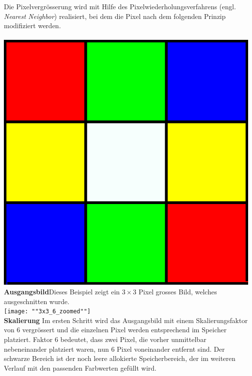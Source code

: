 \documentclass[course=erap]{aspdoc}
\begin{document}
Die Pixelvergrösserung wird mit Hilfe des Pixelwiederholungsverfahrens (engl. {\textit{Nearest Neighbor}}) realisiert, bei dem die Pixel nach dem folgenden Prinzip modifiziert werden. \\
\\
\centering
\includegraphics[scale=0.5]{"3x3"}\\
\justify
\textbf{Ausgangsbild}\hspace{0.5cm}Dieses Beispiel zeigt ein $3 \times 3$ Pixel grosses Bild, welches ausgeschnitten wurde.\\

\centering
\texttt{[image: ""3x3\_6\_zoomed""]}\\
\justify
\textbf{Skalierung}\hspace{0.5cm} Im ersten Schritt wird das Ausgangsbild mit einem Skalierungsfaktor von 6 vergrössert und die einzelnen Pixel werden entsprechend im Speicher platziert. Faktor 6 bedeutet, dass zwei Pixel, die vorher unmittelbar nebeneinander platziert waren, nun 6 Pixel voneinander entfernt sind. Der schwarze Bereich ist der noch leere allokierte Speicherbereich, der im weiteren Verlauf mit den passenden Farbwerten gefüllt wird.\\

\pagebreak
\end{document}
